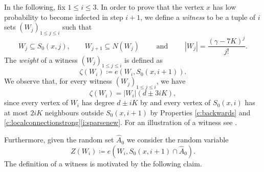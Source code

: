 \documentclass[reqno,a4paper,11pt]{amsart}
\theoremstyle{definition}
\renewcommand{\leq}{\leqslant}
\begin{document}
In the following, fix $1 \leq i \leq 3$.
In order to prove that the vertex $x$ has low probability to become infected in step $i+1$, we define a \emph{witness} to be a tuple of $i$ sets $(W_j)_{1 \leq j \leq i}$ such that
\begin{equation}\label{e:witness-def}
  W_j \subseteq S_0(x, j), \qquad W_{j+1} \subseteq N(W_j) \qquad \text{ and } \qquad |W_j|= \frac{(\gamma - 7K)^j}{j!}.
\end{equation}
The \emph{weight} of a witness $(W_j)_{1 \leq j \leq i}$ is defined as
\[
  \zeta(W_i) \coloneqq e(W_i, S_0(x, i+1)).
\]
We observe that, for every witness $(W_j)_{1 \leq j \leq i}$, we have
\begin{equation}\label{e:witnessobs}
  \zeta(W_i) = |W_i|(d\pm 3iK),
\end{equation}
since every vertex of $W_i$ has degree $d\pm iK$ by  and every vertex of $S_0(x,i)$ has at most $2iK$ neighbours outside $S_0(x,i+1)$ by Properties \ref{c:backwards} and \ref{c:localconnectionstrong}\ref{i:sparsenew}.
For an illustration of a witness see .

Furthermore, given the random set $\hat{A}_0$ we consider the random variable
\[
  Z(W_i) \coloneqq e(W_i, S_0(x, i+1) \cap \hat{A}_0).
\]
The definition of a witness is motivated by the following claim.
\end{document}
